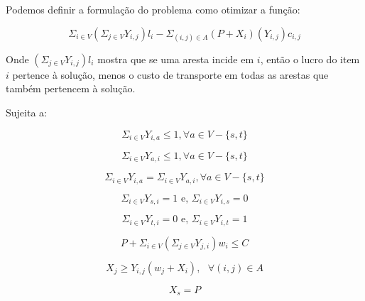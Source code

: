 \documentclass[conference]{IEEEtran}
\begin{document}
    Podemos definir a formulação do problema como otimizar a função:

    \begin{equation}
        \Sigma_{i \in V} (\Sigma_{j \in V} Y_{i,j}) l_i - \Sigma_{(i,j) \in A} (P + X_i)(Y_{i,j})c_{i,j}
    \end{equation}

    Onde $(\Sigma_{j \in V} Y_{i,j}) l_i$ mostra que se uma aresta incide em $i$, então o lucro do item $i$ pertence à solução, menos o custo de transporte em todas as arestas que também pertencem à solução.

    Sujeita a:

    \begin{equation}
        \Sigma_{i \in V} Y_{i,a} \leq 1, \forall a \in V - \{s,t\}
        \label{1}
    \end{equation}

    \begin{equation}
        \Sigma_{i \in V} Y_{a,i} \leq 1, \forall a \in V - \{s,t\}
        \label{2}
    \end{equation}

    \begin{equation}
        \Sigma_{i \in V} Y_{i,a} = \Sigma_{i \in V} Y_{a,i}, \forall a \in V - \{s,t\}
        \label{no-cicle}
    \end{equation}

    \begin{equation}
        \Sigma_{i \in V} Y_{s,i} = 1 \text{  e,  }  \Sigma_{i \in V} Y_{i,s} = 0
        \label{s}
    \end{equation}

    \begin{equation}
        \Sigma_{i \in V} Y_{t,i} = 0 \text{  e,  } \Sigma_{i \in V} Y_{i,t} = 1
        \label{t}
    \end{equation}

    \begin{equation}
        P + \Sigma_{i \in  V} (\Sigma_{j \in V} Y_{j,i}) w_i \leq C
        \label{capacity}
    \end{equation}

    \begin{equation}
        X_j \geq Y_{i,j} ( w_j + X_i ), \text{ } \forall (i,j) \in A
        \label{belong}
    \end{equation}

    \begin{equation}
        X_s = P
        \label{ps}
    \end{equation}
\end{document}
